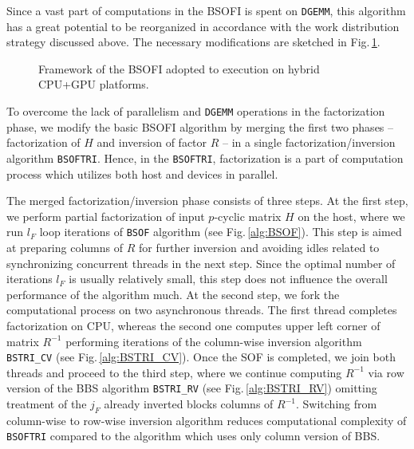 \documentclass{llncs}
\newcommand{\Bsof}{\texttt{BSOF}\xspace}
\newcommand{\Bsoftri}{\texttt{BSOFTRI}\xspace}
\newcommand{\Bsoi}{\texttt{BSOI}\xspace}
\begin{document}
Since 
a vast part of computations in the BSOFI is spent on {\tt DGEMM},
this algorithm has a great potential to be reorganized 
in accordance with the work distribution strategy discussed above.
The necessary modifications are 
sketched %
in Fig.\,\ref{fig:BSOFI_HostDevice}. 
\begin{figure}[t]%
  \scalebox{0.75}{
    
  }
  \caption{Framework of the BSOFI
    adopted to execution on hybrid CPU+GPU platforms.%
    \label{fig:BSOFI_HostDevice}}
\end{figure}
To overcome the lack of parallelism and {\tt DGEMM} operations 
in the factorization phase,  %
we modify the basic BSOFI algorithm 
by merging the first two phases -- 
factorization of $H$ and inversion of factor $R$ -- 
in a single factorization/inversion algorithm \Bsoftri. 
Hence, in the \Bsoftri,
factorization is a part of computation process which
utilizes both host and devices in parallel.

The merged factorization/inversion phase consists of three steps.
At the first step, 
we perform partial factorization of input $p$-cyclic matrix $H$ 
on the host, where we run $l_F$ loop iterations 
of \Bsof algorithm (see Fig.\,\ref{alg:BSOF}).
This step is aimed at preparing columns of $R$ for further inversion and 
avoiding idles related to synchronizing concurrent threads in the next step.
Since the optimal number of iterations $l_F$ is usually relatively small,
this step does not influence the overall performance of the algorithm much.
At the second step, 
we fork the computational process on two asynchronous threads.
The first thread completes factorization on CPU,  
whereas the second one computes upper left corner of matrix $R^{-1}$
performing iterations of the column-wise inversion 
algorithm {\tt BSTRI\_CV} (see Fig.\,\ref{alg:BSTRI_CV}).
Once the SOF is completed, 
we join both threads and proceed to the third step,
where we continue computing $R^{-1}$
via row version of the BBS algorithm {\tt BSTRI\_RV} (see Fig.\,\ref{alg:BSTRI_RV})
omitting treatment of the $j_F$ already inverted blocks columns of $R^{-1}$.
Switching from column-wise to row-wise inversion algorithm 
reduces computational complexity of \Bsoftri 
compared to the algorithm which uses only column version of BBS.
\end{document}
